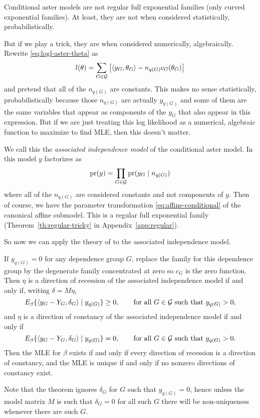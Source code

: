 Conditional aster models are not regular full exponential families
(only curved exponential families).  At least, they are not when
considered statistically, probabilistically.

But if we play a trick, they are when considered numerically, algebraically.
Rewrite \eqref{eq:logl-aster-theta} as
\begin{equation} \label{eq:logl-aster-theta-tricky}
   l(\theta)
   =
   \sum_{G \in \mathcal{G}}
   \left[ \langle y_G, \theta_G \rangle - n_{q(G)} c_G(\theta_G) \right]
\end{equation}
and pretend that all of the $n_{q(G)}$ are constants.  This makes no
sense statistically, probabilistically because those $n_{q(G)}$ are actually
$y_{q(G)}$ and some of them are the same variables that appear as components
of the $y_G$ that also appear in this expression.  But if we are just treating
this log likelihood as a numerical, algebraic function to maximize to find
MLE, then this doesn't matter.

We call this the \emph{associated independence model} of the conditional
aster model.  In this model $y$ factorizes as
\begin{equation} \label{eq:factorize-tricky}
   \operatorname{pr}(y) = \prod_{G \in \mathcal{G}} \operatorname{pr}(y_G \mid n_{q(G)})
\end{equation}
where all of the $n_{q(G)}$ are considered constants and not components of $y$.
Then of course, we have the parameter transformation
\eqref{eq:affine-conditional} of the canonical affine submodel.
This is a regular full exponential family (Theorem~\ref{th:regular-tricky}
in Appendix~\ref{app:regular}).

So now we can apply the theory of \citet{geyer-gdor} to the associated
independence model.
\begin{theorem} \label{th:aim-mle}
If $y_{q(G)} = 0$ for any dependence group $G$, replace
the family for this dependence group by the degenerate family concentrated
at zero so $c_G$ is the zero function.
Then $\eta$ is a direction of recession of the associated independence model
if and only if, writing $\delta = M \eta$,
$$
   E_\beta\{ \langle y_G - Y_G, \delta_G \rangle \mid y_{q(G)} \} \ge 0,
   \qquad \text{for all $G \in \mathcal{G}$ such that $y_{q(G)} > 0$},
$$
and $\eta$ is a direction of constancy of the associated independence model
if and only if
$$
   E_\beta\{ \langle y_G - Y_G, \delta_G \rangle \mid y_{q(G)} \} = 0,
   \qquad \text{for all $G \in \mathcal{G}$ such that $y_{q(G)} > 0$}.
$$
Then the MLE for $\beta$ exists if and only if every direction of recession
is a direction of constancy, and the MLE is unique if and only if no nonzero
directions of constancy exist.
\end{theorem}
Note that the theorem ignores $\delta_G$ for $G$ such that $y_{q(G)} = 0$,
hence unless the model matrix $M$ is such that $\delta_G = 0$ for all such $G$
there will be non-uniqueness whenever there are such $G$.

